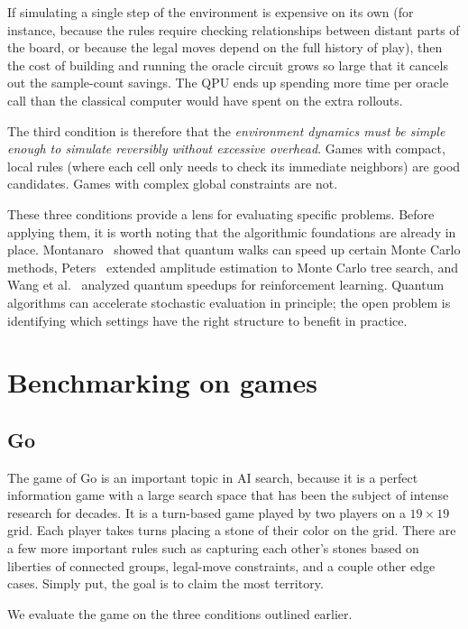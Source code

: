 If simulating a single step of the environment is expensive on its own (for instance, because the rules require checking relationships between distant parts of the board, or because the legal moves depend on the full history of play), then the cost of building and running the oracle circuit grows so large that it cancels out the sample-count savings.
The QPU ends up spending more time per oracle call than the classical computer would have spent on the extra rollouts.

The third condition is therefore that the \emph{environment dynamics must be simple enough to simulate reversibly without excessive overhead}.
Games with compact, local rules (where each cell only needs to check its immediate neighbors) are good candidates.
Games with complex global constraints are not.

These three conditions provide a lens for evaluating specific problems.
Before applying them, it is worth noting that the algorithmic foundations are already in place.
Montanaro~\cite{montanaro2015} showed that quantum walks can speed up certain Monte Carlo methods, Peters~\cite{peters2021} extended amplitude estimation to Monte Carlo tree search, and Wang et al.~\cite{wang2021} analyzed quantum speedups for reinforcement learning.
Quantum algorithms can accelerate stochastic evaluation in principle; the open problem is identifying which settings have the right structure to benefit in practice.

\section{Benchmarking on games}

\subsection{Go}

The game of Go is an important topic in AI search, because it is a perfect information game with a large search space that has been the subject of intense research for decades.
It is a turn-based game played by two players on a $19 \times 19$ grid.
Each player takes turns placing a stone of their color on the grid.
There are a few more important rules such as capturing each other's stones based on liberties of connected groups, legal-move constraints, and a couple other edge cases.
Simply put, the goal is to claim the most territory.

We evaluate the game on the three conditions outlined earlier.

